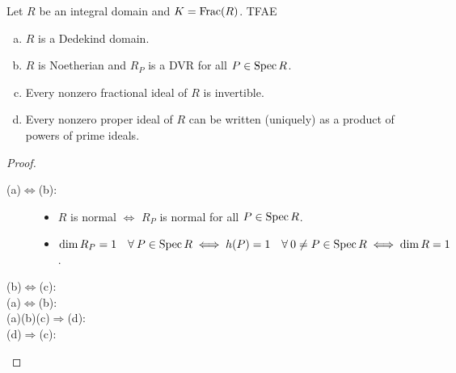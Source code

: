 \begin{theorem}
  Let $R$ be an integral domain and $K= \operatorname{Frac}(R)$. TFAE
  \begin{enumerate}[(a)]
    \item $R$ is a Dedekind domain.
    \item $R$ is Noetherian and $R_P$ is a DVR for all $P \in \operatorname{Spec} R$.
    \item Every nonzero fractional ideal of $R$ is invertible.
    \item Every nonzero proper ideal of $R$ can be written (uniquely) as a
      product of powers of prime ideals.
  \end{enumerate}

  \begin{proof} \mbox{}
    \begin{description}
      \item[\rm (a)$\Leftrightarrow$(b):] \mbox{}
        \begin{itemize}
          \item $R$ is normal $\iff$ $R_P$ is normal for all $P \in \operatorname{Spec} R$.
          \item $\dim R_P = 1 \quad \forall P \in \Spec R \iff h(P) = 1 \quad
            \forall 0 \ne P \in \Spec R \iff \dim R = 1$.
        \end{itemize}
      \item[\rm (b)$\Leftrightarrow$(c):]
      \item[\rm (a)$\Leftrightarrow$(b):]
      \item[\rm (a)(b)(c)$\Rightarrow$(d):]
      \item[\rm (d)$\Rightarrow$(c):]
  \end{description}
  \end{proof}
\end{theorem}
